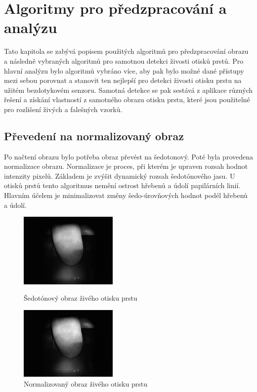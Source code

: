 \chapter{Algoritmy pro předzpracování a analýzu}
Tato kapitola se zabývá popisem použitých algoritmů pro předzpracování obrazu a následně vybraných algoritmů pro samotnou detekci živosti otisků prstů. Pro hlavní analýzu bylo algoritmů vybráno více, aby pak bylo možné dané přístupy mezi sebou porovnat a stanovit ten nejlepší pro detekci živosti otisku prstu na užitém bezdotykovém senzoru. Samotná detekce se pak sestává z aplikace různých řešení a získání vlastností z samotného obrazu otisku prstu, které jsou použitelné pro rozlišení živých a falešných vzorků.
\section{Převedení na normalizovaný obraz}
Po načtení obrazu bylo potřeba obraz převést na šedotonový. Poté byla provedena normalizace obrazu. Normalizace je proces, při kterém je upraven rozsah hodnot intenzity pixelů. Základem je zvýšit dynamický rozsah šedotónového jasu. U otisků prstů tento algoritmus nemění ostrost hřebenů a údolí papilárních linií. Hlavním účelem je minimalizovat změny šedo-úrovňových hodnot podél hřebenů a údolí. \cite{FingerprintImageEnhancement}

\begin{figure}[htbp]
  \begin{minipage}[b]{0.5\linewidth}
    \centering
    \includegraphics[width=180px]{obrazky-figures/live87grayscale.png}
    \caption{Šedotónový obraz živého otisku prstu}
  \end{minipage}
  \hspace{0.5cm}
  \begin{minipage}[b]{0.5\linewidth}
    \centering
    \includegraphics[width=180px]{obrazky-figures/live87norm.png}
    \caption{Normalizovaný obraz živého otisku prstu}
  \end{minipage}
\end{figure}



